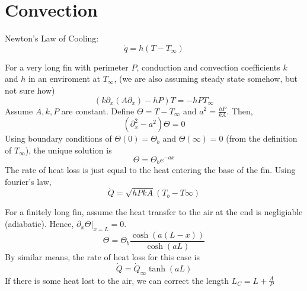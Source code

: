 \documentclass[a4paper]{article}
\numberwithin{equation}{section}
\begin{document}
	\section{Convection}
	Newton's Law of Cooling:
	\begin{equation}
		\dot q=h(T-T_\infty)
	\end{equation}

	For a very long fin with perimeter $P$, conduction and convection coefficients $k$ and $h$ in an enviroment at $T_\infty$, (we are also assuming steady state somehow, but not sure how)
	\begin{equation}
		(k\partial_x(A\partial_x)-hP)T=-hPT_\infty
	\end{equation}
	Assume $A,k,P$ are constant. Define $\Theta=T-T_\infty$ and $a^2=\frac{hP}{kA}$. Then,
	\begin{equation}
		(\partial^2_x-a^2)\Theta=0
	\end{equation}
	Using boundary conditions of $\Theta(0)=\Theta_b$ and $\Theta(\infty)=0$ (from the definition of $T_\infty$), the unique solution is
	\begin{equation}
		\Theta=\Theta_be^{-ax}
	\end{equation}
	The rate of heat loss is just equal to the heat entering the base of the fin. Using fourier's law,
	\begin{equation}
		\dot Q=\sqrt{hPkA}(T_b-T\infty)
	\end{equation}

	For a finitely long fin, assume the heat transfer to the air at the end is negligiable (adiabatic). Hence, $\partial_x\Theta|_{x=L}=0$.	
	\begin{equation}
		\Theta=\Theta_b\frac{\cosh(a(L-x))}{\cosh(aL)}
	\end{equation}
	By similar means, the rate of heat loss for this case is
	\begin{equation}
		\dot Q=\dot Q_\infty\tanh(aL)
	\end{equation}
	If there is some heat lost to the air, we can correct the length $L_C=L+\frac{A}{P}$
\end{document}
